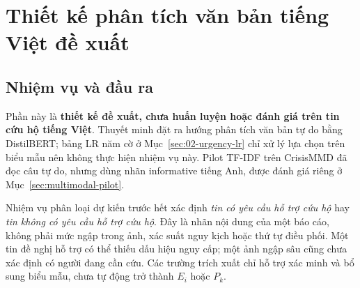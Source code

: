 \section{Thiết kế phân tích văn bản tiếng Việt đề xuất}\label{sec:text-design}
\subsection{Nhiệm vụ và đầu ra}
Phần này là \textbf{thiết kế đề xuất, chưa huấn luyện hoặc đánh giá trên tin cứu hộ tiếng Việt}. Thuyết minh đặt ra hướng phân tích văn bản tự do bằng DistilBERT; bảng LR năm cờ ở Mục~\ref{sec:02-urgency-lr} chỉ xử lý lựa chọn trên biểu mẫu nên không thực hiện nhiệm vụ này. Pilot TF-IDF trên CrisisMMD đã đọc câu tự do, nhưng dùng nhãn informative tiếng Anh, được đánh giá riêng ở Mục~\ref{sec:multimodal-pilot}.

Nhiệm vụ phân loại dự kiến trước hết xác định \emph{tin có yêu cầu hỗ trợ cứu hộ} hay \emph{tin không có yêu cầu hỗ trợ cứu hộ}. Đây là nhãn nội dung của một báo cáo, không phải mức ngập trong ảnh, xác suất nguy kịch hoặc thứ tự điều phối. Một tin đề nghị hỗ trợ có thể thiếu dấu hiệu nguy cấp; một ảnh ngập sâu cũng chưa xác định có người đang cần cứu. Các trường trích xuất chỉ hỗ trợ xác minh và bổ sung biểu mẫu, chưa tự động trở thành $E_i$ hoặc $P_k$.

